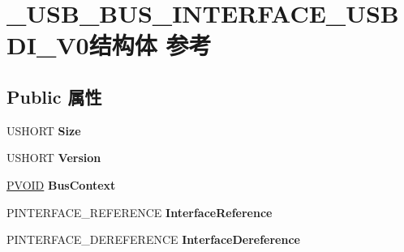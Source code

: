 \hypertarget{struct___u_s_b___b_u_s___i_n_t_e_r_f_a_c_e___u_s_b_d_i___v0}{}\section{\+\_\+\+U\+S\+B\+\_\+\+B\+U\+S\+\_\+\+I\+N\+T\+E\+R\+F\+A\+C\+E\+\_\+\+U\+S\+B\+D\+I\+\_\+\+V0结构体 参考}
\label{struct___u_s_b___b_u_s___i_n_t_e_r_f_a_c_e___u_s_b_d_i___v0}
\subsection*{Public 属性}
\begin{DoxyCompactItemize}
\item 
\mbox{\label{struct___u_s_b___b_u_s___i_n_t_e_r_f_a_c_e___u_s_b_d_i___v0_ad1c2aca9a4ff90072b86409cf633d1cf}} 
U\+S\+H\+O\+RT {\bfseries Size}
\item 
\mbox{\label{struct___u_s_b___b_u_s___i_n_t_e_r_f_a_c_e___u_s_b_d_i___v0_acac46b9fbe7e486a6715a8567f7c8e47}} 
U\+S\+H\+O\+RT {\bfseries Version}
\item 
\mbox{\label{struct___u_s_b___b_u_s___i_n_t_e_r_f_a_c_e___u_s_b_d_i___v0_acdb584e1dfaa05c54f4a07ce0e5952da}} 
\hyperlink{interfacevoid}{P\+V\+O\+ID} {\bfseries Bus\+Context}
\item 
\mbox{\label{struct___u_s_b___b_u_s___i_n_t_e_r_f_a_c_e___u_s_b_d_i___v0_a38f5b330fca15fab39a2589e3c4e2acd}} 
P\+I\+N\+T\+E\+R\+F\+A\+C\+E\+\_\+\+R\+E\+F\+E\+R\+E\+N\+CE {\bfseries Interface\+Reference}
\item 
\mbox{\label{struct___u_s_b___b_u_s___i_n_t_e_r_f_a_c_e___u_s_b_d_i___v0_ab52c6652587677742c11a8393c1bf115}} 
P\+I\+N\+T\+E\+R\+F\+A\+C\+E\+\_\+\+D\+E\+R\+E\+F\+E\+R\+E\+N\+CE {\bfseries Interface\+Dereference}
\item 
\mbox{\label{struct___u_s_b___b_u_s___i_n_t_e_r_f_a_c_e___u_s_b_d_i___v0_adcb6c4ef6dd3da1f854be0c342ea1cb8}} 

\end{DoxyCompactItemize}
